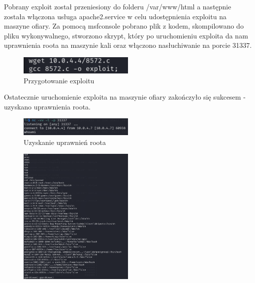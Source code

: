 \documentclass{article}
\begin{document}
Pobrany exploit został przeniesiony do folderu /var/www/html a następnie została włączona usługa apache2.service w celu udostępnienia exploitu na maszyne ofiary.
Za pomocą msfconsole pobrano plik z kodem, skompilowano do pliku wykonywalnego, stworzono skrypt, który po uruchomieniu exploita da nam uprawnienia roota na maszynie kali oraz włączono nasłuchiwanie na porcie 31337.
\begin{figure}
    \centering
    \includegraphics[width=0.5\textwidth]{wykonane_exploita.png}
    \caption{Przygotowanie exploitu}
\end{figure}

Ostatecznie uruchomienie exploita na maszynie ofiary zakończyło się sukcesem - uzyskano uprawnienia roota.

\begin{figure}[H]
    \centering
    \includegraphics[width=0.5\textwidth]{udany_exploit.png}
    \caption{Uzyskanie uprawnień roota}
\end{figure}
\begin{figure}[H]
    \centering
    \includegraphics[width=0.5\textwidth]{root.png}
\end{figure}
\end{document}
